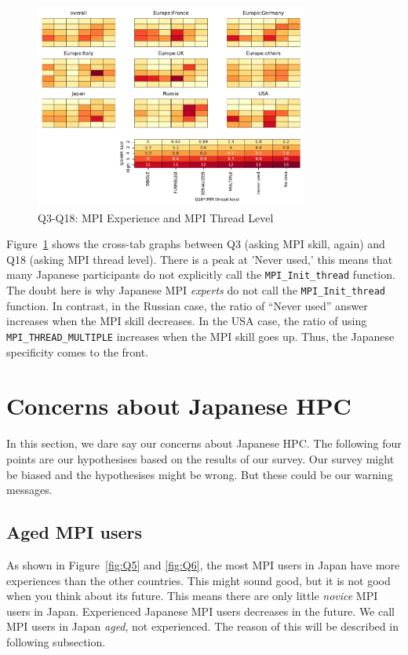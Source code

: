\documentclass[submit,techrep,noauthor,english]{ipsj}
\begin{document}
\begin{figure}[htb]
\begin{center}
\includegraphics[width=9cm]{../pdfs/Q3-Q18.pdf}
\caption{Q3-Q18: MPI Experience and MPI Thread Level}
\label{fig:q3-q18}
\end{center}
\end{figure}

Figure~\ref{fig:q3-q18} shows the cross-tab graphs between
Q3 (asking MPI skill, again) and Q18 (asking MPI thread
level). There is a peak at 'Never used,' this means that many Japanese
participants do not explicitly call the {\tt MPI\_Init\_thread}
function.  The doubt here is why Japanese MPI {\em experts} do not
call the {\tt MPI\_Init\_thread} function. 
In contrast, in the Russian case, the ratio of ``Never used'' answer
increases when the  MPI skill decreases. In the USA case, the ratio of
using {\tt MPI\_THREAD\_MULTIPLE} increases when the MPI skill goes
up. Thus, the Japanese specificity comes to the front.

\section{Concerns about Japanese HPC}

In this section, we dare say our concerns about Japanese HPC. The
following four points are our hypothesises based on the results of our 
survey. Our survey might be biased and the hypothesises might be
wrong. But these could be our warning messages. 

\subsection{Aged MPI users}

As shown in Figure~\ref{fig:Q5} and \ref{fig:Q6}, the most MPI users
in Japan have more experiences than the other countries. This might
sound good, but it is not good when you think about its future.  This
means there are only little {\em novice} MPI users in Japan.
Experienced Japanese MPI users decreases in the future.  We
call MPI users in Japan {\em aged}, not experienced. The reason of
this will be described in following subsection.
\end{document}
